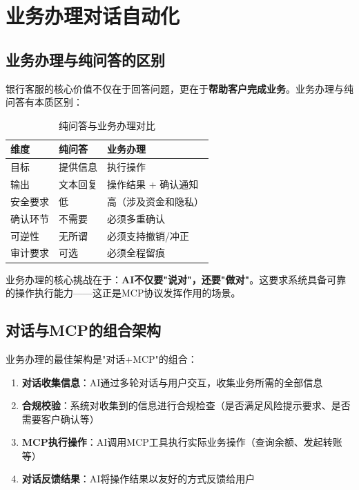 \section{业务办理对话自动化}

\subsection{业务办理与纯问答的区别}

银行客服的核心价值不仅在于回答问题，更在于\textbf{帮助客户完成业务}。业务办理与纯问答有本质区别：

\begin{table}[H]
\centering
\begin{tabular}{lll}
\toprule
\textbf{维度} & \textbf{纯问答} & \textbf{业务办理} \\
\midrule
目标 & 提供信息 & 执行操作 \\
输出 & 文本回复 & 操作结果 + 确认通知 \\
安全要求 & 低 & 高（涉及资金和隐私） \\
确认环节 & 不需要 & 必须多重确认 \\
可逆性 & 无所谓 & 必须支持撤销/冲正 \\
审计要求 & 可选 & 必须全程留痕 \\
\bottomrule
\end{tabular}
\caption{纯问答与业务办理对比}
\end{table}

业务办理的核心挑战在于：\textbf{AI不仅要"说对"，还要"做对"}。这要求系统具备可靠的操作执行能力——这正是MCP协议发挥作用的场景。

\subsection{对话与MCP的组合架构}

业务办理的最佳架构是"对话+MCP"的组合：

\begin{enumerate}[leftmargin=2em]
  \item \textbf{对话收集信息}：AI通过多轮对话与用户交互，收集业务所需的全部信息
  \item \textbf{合规校验}：系统对收集到的信息进行合规检查（是否满足风险提示要求、是否需要客户确认等）
  \item \textbf{MCP执行操作}：AI调用MCP工具执行实际业务操作（查询余额、发起转账等）
  \item \textbf{对话反馈结果}：AI将操作结果以友好的方式反馈给用户
\end{enumerate}

